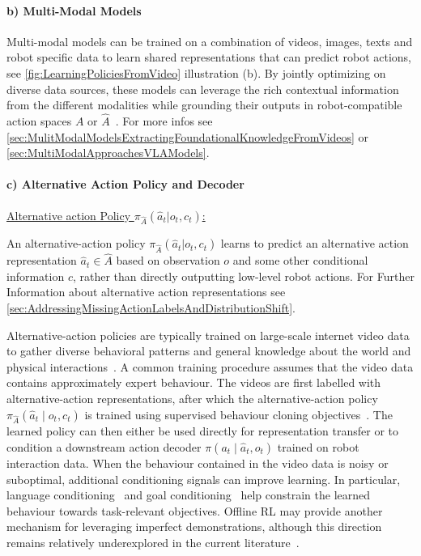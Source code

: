 \paragraph{b) Multi-Modal Models}
Multi-modal models can be trained on a combination of videos, images, texts and robot specific data to learn shared representations that can predict robot actions, see \autoref{fig:LearningPoliciesFromVideo} illustration (b). By jointly optimizing on diverse data sources, these models can leverage the rich contextual information from the different modalities while grounding their outputs in robot-compatible action spaces $A$ or $\hat{A}$~\cite{McCarthy_2025}. For more infos see \autoref{sec:MulitModalModelsExtractingFoundationalKnowledgeFromVideos} or \autoref{sec:MultiModalApproachesVLAModels}.

\paragraph{c) Alternative Action Policy and Decoder}
\underline{Alternative action Policy $\pi_{\hat{A}}(\hat{a}_t|o_t, c_t)$:}
\label{sec:AlternativeActionPolicy}

An alternative-action policy $\pi_{\hat{A}}(\hat{a}_t|o_t, c_t)$ learns to predict an alternative action representation $\hat{a}_t \in \hat{A}$ based on observation $o$ and some other conditional information $c$, rather than directly outputting low-level robot actions. For Further Information about alternative action representations see \autoref{sec:AddressingMissingActionLabelsAndDistributionShift}. 

Alternative-action policies are typically trained on large-scale internet video data to gather diverse behavioral patterns and general knowledge about the world and physical interactions~\cite{Schmidt2023LearningTA}.
A common training procedure assumes that the video data contains approximately expert behaviour. The videos are first labelled with alternative-action representations, after which the alternative-action policy $\pi_{\hat{A}}(\hat{a}_t \mid o_t, c_t)$ is trained using supervised behaviour cloning objectives~\cite{Schmidt2023LearningTA,Bruce2024GenieGI,Wang2023MimicPlayLI,Du2023VideoLP,Black2023ZeroShotRM,Wen2023AnypointTM,Bharadhwaj2023TowardsGZ}. The learned policy can then either be used directly for representation transfer or to condition a downstream action decoder $\pi(a_t \mid \hat{a}_t, o_t)$ trained on robot interaction data.
When the behaviour contained in the video data is noisy or suboptimal, additional conditioning signals can improve learning. In particular, language conditioning~\cite{Du2023VideoLP,Wen2023AnypointTM} and goal conditioning~\cite{Wang2023MimicPlayLI} help constrain the learned behaviour towards task-relevant objectives. Offline \ac{RL} may provide another mechanism for leveraging imperfect demonstrations, although this direction remains relatively underexplored in the current literature~\cite{McCarthy_2025}.

